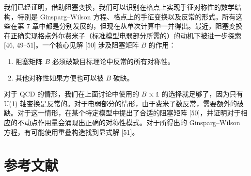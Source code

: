 我们已经证明，借助阻塞变换，我们可以识别在格点上实现手征对称性的数学结构，特别是 Ginsparg--Wilson 方程、格点上的手征变换以及反常的形式。所有这些在第 7 章中都是分别发展的，但现在从单次计算中一并得出。最近，阻塞变换在正确实现格点外尔费米子（标准模型电弱部分所需的）的动机下被进一步探索 [46, 49--51]。一个核心见解 [50] 涉及阻塞矩阵 $B$ 的作用：
\begin{enumerate}
  \item 阻塞矩阵 $B$ 必须破缺目标理论中反常的所有对称性。
  \item 其他对称性如果方便也可以被 $B$ 破缺。
\end{enumerate}
对于 QCD 的情形，我们在上面讨论中使用的 $B \propto \mathbb{1}$ 的选择就足够了，因为只有 U(1) 轴变换是反常的。对于电弱部分的情形，由于费米子数反常，需要额外的破缺。对于这一情形，在某个特定模型中提出了合适的阻塞矩阵 [50]，并证明对于相应的不动点作用量会涌现出正确的对称性模式。对于所得出的 Ginsparg--Wilson 方程，有可能使用重叠构造找到显式解 [51]。

\section*{参考文献}


